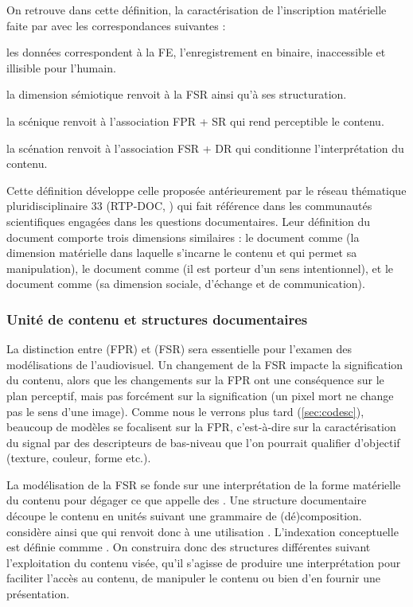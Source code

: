 On retrouve dans cette définition, la caractérisation de l'inscription matérielle faite par \cite{bachimont:icc} avec les correspondances suivantes : 
\begin{liste}
	\item les données correspondent à la FE, l'enregistrement en binaire, inaccessible et illisible pour l'humain. 
	\item la dimension sémiotique renvoit à la FSR ainsi qu'à ses structuration.
	\item la scénique renvoit à l'association FPR + SR qui rend perceptible le contenu.
	\item la scénation renvoit à l'association FSR + DR qui conditionne l'interprétation du contenu.
\end{liste}

Cette définition développe celle proposée antérieurement par le réseau thématique pluridisciplinaire 33 (RTP-DOC, \cite{Pedauque2003}) qui fait référence dans les communautés scientifiques engagées dans les questions documentaires.
Leur définition du document comporte trois dimensions similaires : le document comme  (la dimension matérielle dans laquelle s’incarne le contenu et qui permet sa manipulation), le document comme  (il est porteur d’un sens intentionnel), et le document comme  (sa dimension sociale, d'échange et de communication).

 


\subsubsection{Unité de contenu et structures documentaires}\label{sec:uc-sd}
La distinction entre  (FPR) et  (FSR) sera essentielle pour l'examen des modélisations de l'audiovisuel.
Un changement de la FSR impacte la signification du contenu, alors que les changements sur la FPR ont une conséquence sur le plan perceptif, mais pas forcément sur la signification (un pixel mort ne change pas le sens d'une image).
Comme nous le verrons plus tard (\ref{sec:codesc}), beaucoup de modèles se focalisent sur la FPR, c'est-à-dire sur la caractérisation du signal par des descripteurs de bas-niveau que l'on pourrait qualifier d'objectif (texture, couleur, forme etc.).

La modélisation de la FSR se fonde sur une interprétation de la forme matérielle du contenu pour dégager ce que \cite{Prie2000} appelle des .
Une structure documentaire découpe le contenu en unités suivant une grammaire de (dé)composition.
\citeauthor{Prie2000} considère ainsi que  qui renvoit donc à une utilisation .
L'indexation conceptuelle est définie commme .
On construira donc des structures différentes suivant l'exploitation du contenu visée, qu'il s'agisse de produire une interprétation pour faciliter l'accès au contenu, de manipuler le contenu ou bien d'en fournir une présentation. 

